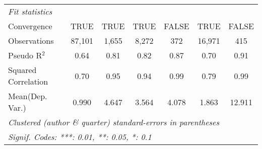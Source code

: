 \begin{tabular}{lcccccc}
   \midrule
   \emph{Fit statistics}\\
   Convergence                                                &TRUE           & TRUE          & TRUE          & FALSE     & TRUE          & FALSE\\  
   Observations                                               & 87,101        & 1,655         & 8,272         & 372       & 16,971        & 415\\  
   Pseudo R$^2$                                               & 0.64          & 0.81          & 0.82          & 0.87      & 0.70          & 0.91\\  
   Squared Correlation                                        & 0.70          & 0.95          & 0.94          & 0.99      & 0.79          & 0.99\\  
Mean(Dep. Var.) & 0.990 & 4.647 & 3.564 & 4.078 & 1.863 & 12.911 \\
   \midrule \midrule
   \multicolumn{7}{l}{\emph{Clustered (author \& quarter) standard-errors in parentheses}}\\
   \multicolumn{7}{l}{\emph{Signif. Codes: ***: 0.01, **: 0.05, *: 0.1}}\\
\end{tabular}
\par\endgroup
